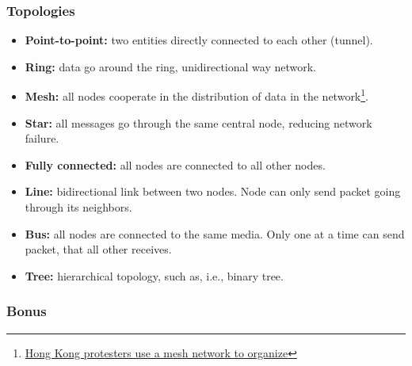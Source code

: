   \begin{frame}
    \frametitle{Topologies}
    \begin{itemize}
      \item \textbf{Point-to-point:} two entities directly connected to each other (tunnel).\pause
      \item \textbf{Ring:} data go around the ring, unidirectional way network.\pause
      \item \textbf{Mesh:} all nodes cooperate in the distribution of data in the network\footnote{\color{blue}\href{http://www.newscientist.com/article/dn26285-hong-kong-protesters-use-a-mesh-network-to-organise.html}{Hong Kong protesters use a mesh network to organize}}.\pause
      \item \textbf{Star:} all messages go through the same central node, reducing network failure.\pause
      \item \textbf{Fully connected:} all nodes are connected to all other nodes.\pause
      \item \textbf{Line:} bidirectional link between two nodes. Node can only send packet going through its neighbors.\pause
      \item \textbf{Bus:} all nodes are connected to the same media. Only one at a time can send packet, that all other receives.\pause
      \item \textbf{Tree:} hierarchical topology, such as, i.e., binary tree.
    \end{itemize}
  \end{frame}
  \begin{frame}
    \frametitle{Bonus}

      \end{frame}


